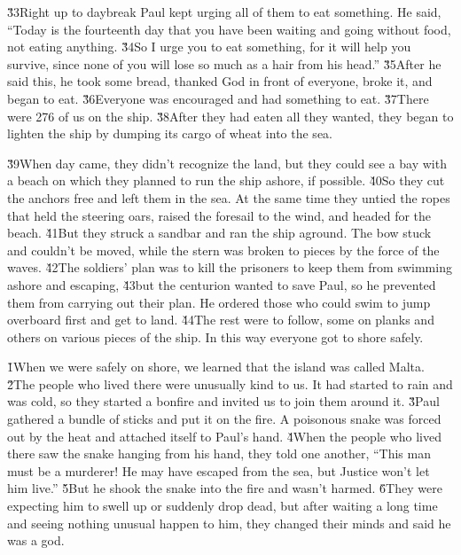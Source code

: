 \v{33}Right up to daybreak Paul kept urging all of them to eat something. He said, ``Today is the fourteenth day that you have been waiting and going without food, not eating anything. \v{34}So I urge you to eat something, for it will help you survive, since none of you will lose so much as a hair from his head.'' \v{35}After he said this, he took some bread, thanked God in front of everyone, broke it, and began to eat. \v{36}Everyone was encouraged and had something to eat. \v{37}There were 276 of us on the ship. \v{38}After they had eaten all they wanted, they began to lighten the ship by dumping its cargo of wheat into the sea.

\v{39}When day came, they didn't recognize the land, but they could see a bay with a beach on which they planned to run the ship ashore, if possible. \v{40}So they cut the anchors free and left them in the sea. At the same time they untied the ropes that held the steering oars, raised the foresail to the wind, and headed for the beach. \v{41}But they struck a sandbar and ran the ship aground. The bow stuck and couldn't be moved, while the stern was broken to pieces by the force of the waves. \v{42}The soldiers' plan was to kill the prisoners to keep them from swimming ashore and escaping, \v{43}but the centurion wanted to save Paul, so he prevented them from carrying out their plan. He ordered those who could swim to jump overboard first and get to land. \v{44}The rest were to follow, some on planks and others on various pieces of the ship. In this way everyone got to shore safely.

\v{1}When we were safely on shore, we learned that the island was called Malta. \v{2}The people who lived there were unusually kind to us. It had started to rain and was cold, so they started a bonfire and invited us to join them around it. \v{3}Paul gathered a bundle of sticks and put it on the fire. A poisonous snake was forced out by the heat and attached itself to Paul's hand. \v{4}When the people who lived there saw the snake hanging from his hand, they told one another, ``This man must be a murderer! He may have escaped from the sea, but Justice won't let him live.'' \v{5}But he shook the snake into the fire and wasn't harmed. \v{6}They were expecting him to swell up or suddenly drop dead, but after waiting a long time and seeing nothing unusual happen to him, they changed their minds and said he was a god.

